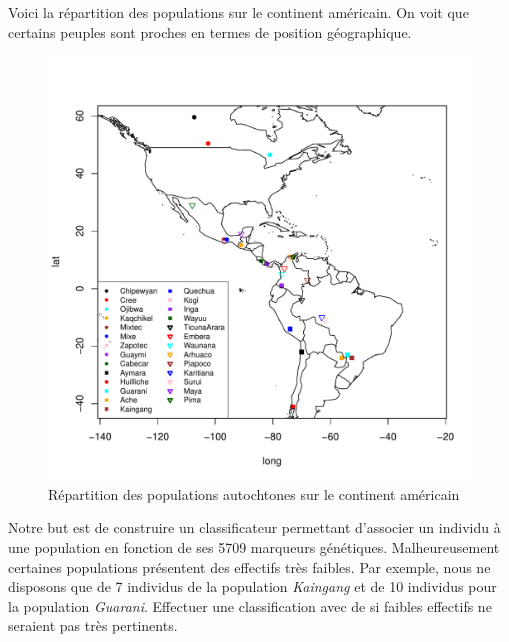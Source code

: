 \documentclass[12pt,a4paper]{article}
\begin{document}
Voici la répartition des populations sur le continent américain. On voit que 
certains peuples sont proches en termes de position géographique.

\begin{figure}[h!]
	\begin{center}
		\includegraphics[scale=0.8]{figures/map.pdf}
		\caption{Répartition des populations autochtones sur le continent américain}
		\label{fig:acp_plot}
	\end{center}
\end{figure}

Notre but est de construire un classificateur permettant d'associer un individu
à une population en fonction de ses 5709 marqueurs génétiques. Malheureusement
certaines populations présentent des effectifs très faibles. Par exemple, nous
ne disposons que de 7 individus de la population \textit{Kaingang} et de 10
individus pour la population \textit{Guarani}. Effectuer une classification
avec de si faibles effectifs ne seraient pas très pertinents.\vspace{2mm}
\end{document}
